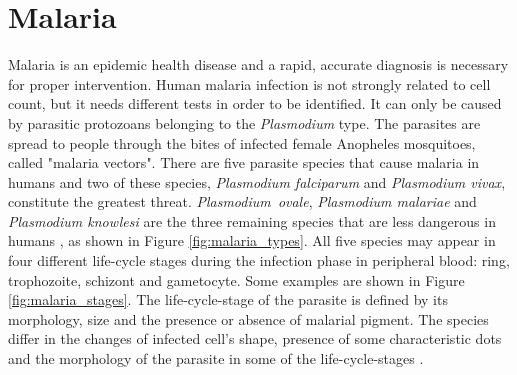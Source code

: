 \documentclass[final,a4paper,12pt,english]{UnicaPhdThesis3}
\begin{document}
\section{Malaria}
Malaria is an epidemic health disease and a rapid, accurate diagnosis is necessary for proper intervention. 
Human malaria infection is not strongly related to cell count, but it needs different tests in order to be identified. It can only be caused by parasitic protozoans belonging to the \emph{Plasmodium} type. The parasites are spread to people through the bites of infected female Anopheles mosquitoes, called "malaria vectors".
There are five parasite species that cause malaria in humans and two of these species, \emph{Plasmodium falciparum} and \emph{Plasmodium vivax}, constitute the greatest threat. \emph{Plasmodium~ovale}, \emph{Plasmodium malariae} and \emph{Plasmodium knowlesi} are the three remaining species that are less dangerous in humans \cite{WHO_dec_2016}, as shown in Figure \ref{fig:malaria_types}.
All five species may appear in four different life-cycle stages during the infection phase in peripheral blood: ring, trophozoite, schizont and gametocyte. Some examples are shown in Figure \ref{fig:malaria_stages}.
The life-cycle-stage of the parasite is defined by its morphology, size and the presence or absence of malarial pigment.
The species differ in the changes of infected cell's shape, presence of some characteristic dots and the morphology of the parasite in some of the life-cycle-stages \cite{Somasekar2011}.
\end{document}
